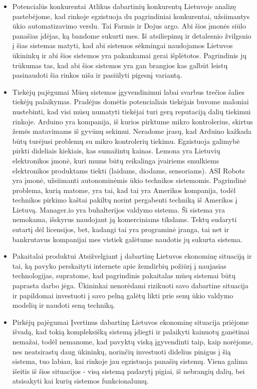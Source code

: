 \documentclass[oneside]{VUMIFPSkursinis}
\begin{document}
	\begin{itemize}
		\item{Potencialūs konkurentai}
Atlikus dabartinių konkurentų Lietuvoje analizę pastebėjome, kad rinkoje egzistuoja du pagrindiniai konkurentai, užsiimantys ūkio automatizavimo verslu. Tai Farmis ir Dojus argo. Abi šios įmonės siūlo panašias įdėjas, ką bandome sukurti mes. Iš atsiliepimų ir detalesnio žvilgsnio į šias sistemas matyti, kad abi sistemos sėkmingai naudojamos Lietuvos ūkininkų ir abi šios sistemos yra pakankamai gerai išplėtotos. Pagrindinis jų trūkumas tas, kad abi šios sistemos yra gan brangios kas galbūt leistų pasinaudoti šia rinkos niša ir pasiūlyti pigesnį variantą.
		\item{Tiekėjų pajėgumai}
Mūsų sistemos įgyvendinimui labai svarbus trečios šalies tiekėjų palaikymas. Pradėjus domėtis potencialiais tiekėjais buvome maloniai nustebinti, kad visi mūsų numatyti tiekėjai turi gerą reputaciją dalių tiekimui rinkoje. Arduino yra kompanija, iš kurios pirktume mikro kontrolerius, skirtus žemės matavimams iš gyvūnų sekimui. Neradome įrasų, kad Arduino kažkada būtų turėjusi problemų su mikro kontrolerių tiekimu. Egzistuoja galimybė pirkti dideliais kiekiais, kas sumažintų kainas. Lemona yra Lietuvių elektronikos įmonė, kuri mums būtų reikalinga įvairiems smulkiems elektronikos produktams tiekti (laidams, diodams, sensoriams). ASI Robots yra įmonė, užsiimanti autonominėmis ūkio technikos sistemomis. Pagrindinė problema, kurią matome, yra tai, kad tai yra Amerikos kompanija, todėl technikos pirkimo kaštai pakiltų norint pergabenti techniką iš Amerikos į Lietuvą. Manager.io yra buhalterijos valdymo sistema. Ši sistema yra nemokama, išskyrus naudojant ją komerciniams tikslams. Tektų sudaryti sutartį dėl licensijos, bet, kadangi tai yra programinė įranga, tai net ir bankrutavus kompanijai mes vistiek galėtume naudotis jų sukurta sistema.
		\item{Pakaitalai produktui}
Atsižvelgiant į dabartinę Lietuvos ekonominę situaciją ir tai, ką pavyko perskaityti internete apie žemdirbių požiūrį į naujasias technologijas, supratome, kad pagrindinis pakaitalas mūsų sistemai būtų paprasta darbo jėga. Ūkininkai nenorėdami rizikuoti savo dabartine situacija ir papildomai investuoti į savo pelną galėtų likti prie senų ūkio valdymo modelių ir naudoti seną techniką.
		\item{Pirkėjų pajėgumai}
Įvertinus dabartinę Lietuvos ekonominę situacija priėjome išvadą, kad tokią kompleksišką sistemą įdiegti ir palaikyti kainuotų ganėtinai nemažai, todėl nemanome, kad pavyktų viską įgyvendinti taip, kaip norėjome, nes neatsirastų daug ūkininkų, norinčių investuoti didelius pinigus į šią sistema, tuo labiau, kai rinkoje jau egzistuoja panašių sistemų. Viena galima išeitis iš šios situacijos - visą sistemą padarytį pigiai, iš nebrangių dalių, bei atsisakyti kai kurių sistemos funkcionalumų.

\end{itemize}
\end{document}
